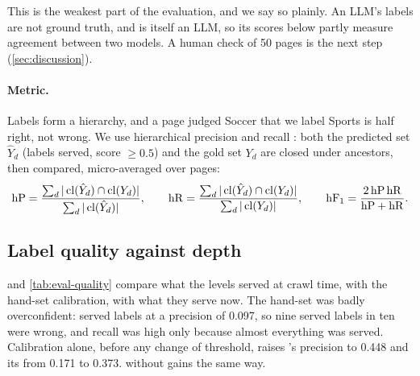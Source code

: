 This is the weakest part of the evaluation, and we say so plainly. An LLM's labels are not ground truth, and  is itself an LLM, so its scores below partly measure agreement between two models. A human check of 50 pages is the next step (\cref{sec:discussion}).

\paragraph{Metric.} Labels form a hierarchy, and a page judged Soccer that we label Sports is half right, not wrong. We use hierarchical precision and recall \citep{kiritchenko2006learning}: both the predicted set $\hat{Y}_d$ (labels served, score $\ge 0.5$) and the gold set $Y_d$ are closed under ancestors, then compared, micro-averaged over pages:
\begin{equation}\label{eq:eval-hprf}
  \mathrm{hP} = \frac{\sum_d |\operatorname{cl}(\hat{Y}_d) \cap \operatorname{cl}(Y_d)|}{\sum_d |\operatorname{cl}(\hat{Y}_d)|},
  \qquad
  \mathrm{hR} = \frac{\sum_d |\operatorname{cl}(\hat{Y}_d) \cap \operatorname{cl}(Y_d)|}{\sum_d |\operatorname{cl}(Y_d)|},
  \qquad
  \mathrm{hF}_1 = \frac{2\,\mathrm{hP}\,\mathrm{hR}}{\mathrm{hP} + \mathrm{hR}}.
\end{equation}

\subsection{Label quality against depth}\label{sec:eval-quality}

 and \cref{tab:eval-quality} compare what the levels served at crawl time, with the hand-set calibration, with what they serve now. The hand-set  was badly overconfident:  served labels at a precision of 0.097, so nine served labels in ten were wrong, and recall was high only because almost everything was served. Calibration alone, before any change of threshold, raises 's precision to 0.448 and its \hF{} from 0.171 to 0.373.  without  gains the same way.

